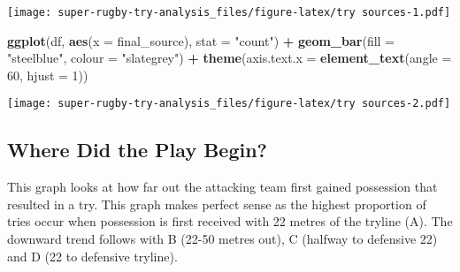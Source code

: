 \documentclass[
]{article}
\newenvironment{Shaded}{\begin{snugshade}}{\end{snugshade}}
\newcommand{\DataTypeTok}[1]{\textcolor[rgb]{0.13,0.29,0.53}{#1}}
\newcommand{\DecValTok}[1]{\textcolor[rgb]{0.00,0.00,0.81}{#1}}
\newcommand{\KeywordTok}[1]{\textcolor[rgb]{0.13,0.29,0.53}{\textbf{#1}}}
\newcommand{\NormalTok}[1]{#1}
\newcommand{\OperatorTok}[1]{\textcolor[rgb]{0.81,0.36,0.00}{\textbf{#1}}}
\newcommand{\StringTok}[1]{\textcolor[rgb]{0.31,0.60,0.02}{#1}}
\begin{document}
\texttt{[image: super-rugby-try-analysis\_files/figure-latex/try sources-1.pdf]}

\begin{Shaded}
\begin{Highlighting}[]
\KeywordTok{ggplot}\NormalTok{(df, }\KeywordTok{aes}\NormalTok{(}\DataTypeTok{x =}\NormalTok{ final_source), }\DataTypeTok{stat =} \StringTok{"count"}\NormalTok{) }\OperatorTok{+}
\StringTok{  }\KeywordTok{geom_bar}\NormalTok{(}\DataTypeTok{fill =} \StringTok{"steelblue"}\NormalTok{, }\DataTypeTok{colour =} \StringTok{"slategrey"}\NormalTok{) }\OperatorTok{+}\StringTok{ }
\StringTok{  }\KeywordTok{theme}\NormalTok{(}\DataTypeTok{axis.text.x =} \KeywordTok{element_text}\NormalTok{(}\DataTypeTok{angle =} \DecValTok{60}\NormalTok{, }\DataTypeTok{hjust =} \DecValTok{1}\NormalTok{))}
\end{Highlighting}
\end{Shaded}

\texttt{[image: super-rugby-try-analysis\_files/figure-latex/try sources-2.pdf]}

\hypertarget{where-did-the-play-begin}{%
\subsection{\texorpdfstring{\textbf{Where Did the Play
Begin?}}{Where Did the Play Begin?}}\label{where-did-the-play-begin}}

This graph looks at how far out the attacking team first gained
possession that resulted in a try. This graph makes perfect sense as the
highest proportion of tries occur when possession is first received with
22 metres of the tryline (A). The downward trend follows with B (22-50
metres out), C (halfway to defensive 22) and D (22 to defensive
tryline).

\begin{Shaded}
\end{Shaded}
\end{document}

